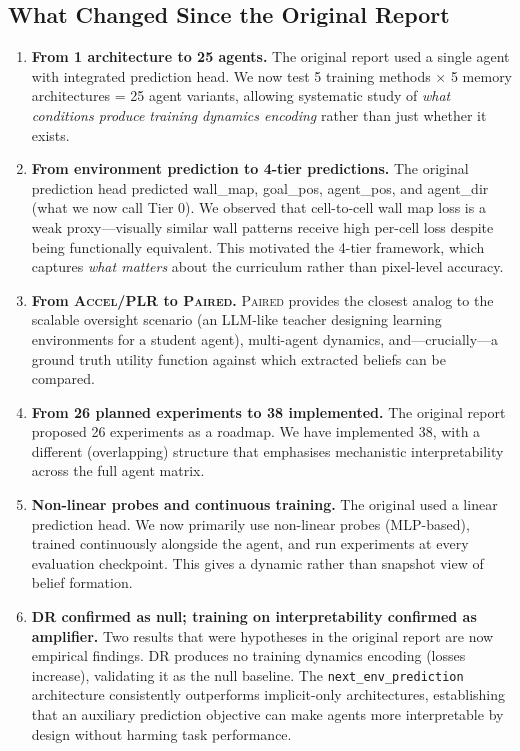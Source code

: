 \documentclass[11pt,a4paper]{article}
\theoremstyle{remark}
\newcommand{\paired}{\textsc{Paired}}
\newcommand{\accel}{\textsc{Accel}}
\newcommand{\plr}{\textsc{PLR}}
\newcommand{\dr}{\textsc{DR}}
\begin{document}
\subsection{What Changed Since the Original Report}

\begin{enumerate}
    \item \textbf{From 1 architecture to 25 agents.} The original report used a single agent with integrated prediction head. We now test 5 training methods $\times$ 5 memory architectures = 25 agent variants, allowing systematic study of \textit{what conditions produce training dynamics encoding} rather than just whether it exists.

    \item \textbf{From environment prediction to 4-tier predictions.} The original prediction head predicted wall\_map, goal\_pos, agent\_pos, and agent\_dir (what we now call Tier 0). We observed that cell-to-cell wall map loss is a weak proxy---visually similar wall patterns receive high per-cell loss despite being functionally equivalent. This motivated the 4-tier framework, which captures \textit{what matters} about the curriculum rather than pixel-level accuracy.

    \item \textbf{From \accel{}/\plr{} to \paired{}.} \paired{} provides the closest analog to the scalable oversight scenario (an LLM-like teacher designing learning environments for a student agent), multi-agent dynamics, and---crucially---a ground truth utility function against which extracted beliefs can be compared.

    \item \textbf{From 26 planned experiments to 38 implemented.} The original report proposed 26 experiments as a roadmap. We have implemented 38, with a different (overlapping) structure that emphasises mechanistic interpretability across the full agent matrix.

    \item \textbf{Non-linear probes and continuous training.} The original used a linear prediction head. We now primarily use non-linear probes (MLP-based), trained continuously alongside the agent, and run experiments at every evaluation checkpoint. This gives a dynamic rather than snapshot view of belief formation.

    \item \textbf{DR confirmed as null; training on interpretability confirmed as amplifier.} Two results that were hypotheses in the original report are now empirical findings. \dr{} produces no training dynamics encoding (losses increase), validating it as the null baseline. The \texttt{next\_env\_prediction} architecture consistently outperforms implicit-only architectures, establishing that an auxiliary prediction objective can make agents more interpretable by design without harming task performance.
\end{enumerate}
\end{document}
